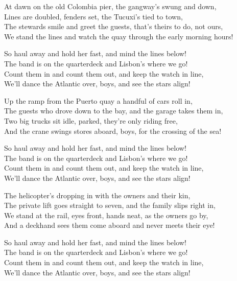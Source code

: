 \begin{lyrics}
At dawn on the old Colombia pier, the gangway’s swung and down,\\
Lines are doubled, fenders set, the Tucuxi’s tied to town,\\
The stewards smile and greet the guests, that’s theirs to do, not ours,\\
We stand the lines and watch the quay through the early morning hours!

So haul away and hold her fast, and mind the lines below!\\
The band is on the quarterdeck and Lisbon’s where we go!\\
Count them in and count them out, and keep the watch in line,\\
We’ll dance the Atlantic over, boys, and see the stars align!

Up the ramp from the Puerto quay a handful of cars roll in,\\
The guests who drove down to the bay, and the garage takes them in,\\
Two big trucks sit idle, parked, they’re only riding free,\\
And the crane swings stores aboard, boys, for the crossing of the sea!

So haul away and hold her fast, and mind the lines below!\\
The band is on the quarterdeck and Lisbon’s where we go!\\
Count them in and count them out, and keep the watch in line,\\
We’ll dance the Atlantic over, boys, and see the stars align!

The helicopter’s dropping in with the owners and their kin,\\
The private lift goes straight to seven, and the family slips right in,\\
We stand at the rail, eyes front, hands neat, as the owners go by,\\
And a deckhand sees them come aboard and never meets their eye!

So haul away and hold her fast, and mind the lines below!\\
The band is on the quarterdeck and Lisbon’s where we go!\\
Count them in and count them out, and keep the watch in line,\\
We’ll dance the Atlantic over, boys, and see the stars align!


\end{lyrics}
